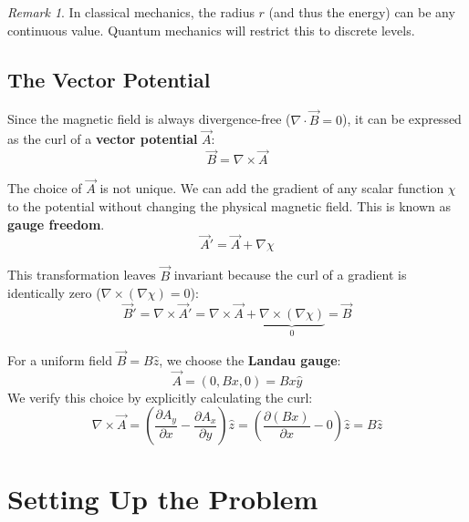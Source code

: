 \documentclass[11pt,a4paper]{article}
\let\oldsection\section
\renewcommand{\section}{\needspace{5\baselineskip}\oldsection}
\let\oldsubsection\subsection
\renewcommand{\subsection}{\needspace{4\baselineskip}\oldsubsection}
\theoremstyle{definition}
\theoremstyle{remark}
\newtheorem{remark}{Remark}[section]
\begin{document}
\begin{remark}
In classical mechanics, the radius $r$ (and thus the energy) can be any continuous value. Quantum mechanics will restrict this to discrete levels.
\end{remark}

\subsection{The Vector Potential}

Since the magnetic field is always divergence-free ($\nabla \cdot \vec{B} = 0$), it can be expressed as the curl of a \textbf{vector potential} $\vec{A}$:
\begin{equation}
    \vec{B} = \nabla \times \vec{A}
\end{equation}

The choice of $\vec{A}$ is not unique. We can add the gradient of any scalar function $\chi$ to the potential without changing the physical magnetic field. This is known as \textbf{gauge freedom}.
\begin{equation}
    \vec{A}' = \vec{A} + \nabla\chi
\end{equation}

This transformation leaves $\vec{B}$ invariant because the curl of a gradient is identically zero ($\nabla \times (\nabla \chi) = 0$):
\begin{equation}
    \vec{B}' = \nabla \times \vec{A}' = \nabla \times \vec{A} + \underbrace{\nabla \times (\nabla\chi)}_{0} = \vec{B}
\end{equation}

For a uniform field $\vec{B} = B\hat{z}$, we choose the \textbf{Landau gauge}:
\begin{equation}
    \vec{A} = (0, Bx, 0) = Bx\hat{y}
\end{equation}
We verify this choice by explicitly calculating the curl:
\begin{equation}
    \nabla \times \vec{A} = \left( \frac{\partial A_y}{\partial x} - \frac{\partial A_x}{\partial y} \right) \hat{z} = \left( \frac{\partial (Bx)}{\partial x} - 0 \right) \hat{z} = B\hat{z}
\end{equation}



\section{Setting Up the Problem}
\end{document}
